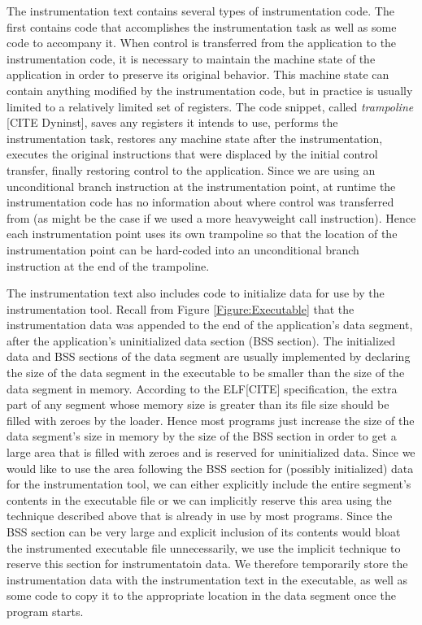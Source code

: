 The instrumentation text contains several types of instrumentation code. The first
contains code that accomplishes the instrumentation task as well as some code to
accompany it. When control is transferred from the application to the
instrumentation code, it is necessary to maintain the machine state of
the application in order to preserve its original behavior. This machine state
can contain anything modified by the instrumentation code, but in practice is
usually limited to a relatively limited set of registers. The code snippet, called \textit{trampoline} [CITE Dyninst], 
saves any registers it intends to use, performs the instrumentation task, restores
any machine state after the instrumentation, executes the
original instructions that were displaced by the initial control transfer,
finally restoring control to the application. Since we are using an
unconditional branch instruction at the instrumentation point, at runtime the
instrumentation code has no information about where control was transferred from
(as might be the case if we used a more heavyweight call instruction). Hence
each instrumentation point uses its own trampoline so that the location of the
instrumentation point can be hard-coded into an unconditional branch instruction
at the end of the trampoline.

The instrumentation text also includes code to initialize data for use by the
instrumentation tool. Recall from Figure \ref{Figure:Executable} that the instrumentation
data was appended to the end of the application's data segment, after the
application's uninitialized data section  (BSS section). The initialized data and BSS
sections of the data segment are usually implemented by declaring the size of
the data segment in the executable to be smaller than the size of the data
segment in memory. According to the ELF[CITE] specification, the extra part of any
segment whose memory size is greater than its file size should be filled with
zeroes by the loader. Hence most programs just increase the size of the data
segment's size in memory by the size of the BSS section in order to get a large
area that is filled with zeroes and is reserved for uninitialized data. Since we
would like to use the area following the BSS section for (possibly initialized)
data for the instrumentation tool, we can either explicitly include the entire
segment's contents in the executable file or we can implicitly reserve this area
using the technique described above that is already in use by most programs.
Since the BSS section can be very large and explicit inclusion of its contents
would bloat the instrumented executable file unnecessarily, we use the implicit
technique to reserve this section for instrumentatoin data. We therefore
temporarily store the instrumentation data with the instrumentation text in the
executable, as well as some code to copy it to the appropriate location in the
data segment once the program starts.
